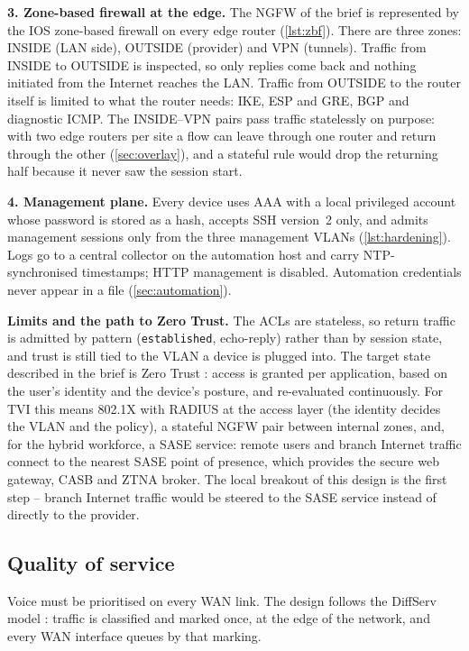 \textbf{3. Zone-based firewall at the edge.} The NGFW of the brief is represented by the IOS zone-based
firewall on every edge router (\cref{lst:zbf}). There are three zones: INSIDE (LAN side), OUTSIDE (provider)
and VPN (tunnels). Traffic from INSIDE to OUTSIDE is inspected, so only replies come back and nothing initiated
from the Internet reaches the LAN. Traffic from OUTSIDE to the router itself is limited to what the router
needs: IKE, ESP and GRE, BGP and diagnostic ICMP. The INSIDE--VPN pairs pass traffic statelessly on purpose:
with two edge routers per site a flow can leave through one router and return through the other
(\cref{sec:overlay}), and a stateful rule would drop the returning half because it never saw the session start.


\textbf{4. Management plane.} Every device uses AAA with a local privileged account whose password is stored
as a hash, accepts SSH version~2 only, and admits management sessions only from the three management VLANs
(\cref{lst:hardening}). Logs go to a central collector on the automation host and carry NTP-synchronised
timestamps; HTTP management is disabled. Automation credentials never appear in a file (\cref{sec:automation}).

\textbf{Limits and the path to Zero Trust.} The ACLs are stateless, so return traffic is admitted by pattern
(\texttt{established}, echo-reply) rather than by session state, and trust is still tied to the VLAN a device
is plugged into. The target state described in the brief is Zero Trust \cite{nist800207}: access is granted
per application, based on the user's identity and the device's posture, and re-evaluated continuously. For TVI
this means 802.1X with RADIUS at the access layer (the identity decides the VLAN and the policy), a stateful
NGFW pair between internal zones, and, for the hybrid workforce, a SASE service: remote users and branch
Internet traffic connect to the nearest SASE point of presence, which provides the secure web gateway, CASB and
ZTNA broker. The local breakout of this design is the first step -- branch Internet traffic would be steered
to the SASE service instead of directly to the provider.

\subsection{Quality of service}\label{sec:qos}
Voice must be prioritised on every WAN link. The design follows the DiffServ model \cite{rfc2474,rfc4594}:
traffic is classified and marked once, at the edge of the network, and every WAN interface queues by that
marking.

